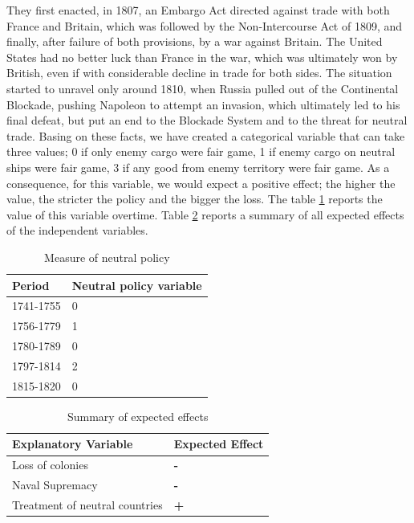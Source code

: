 \documentclass[12pt,a4paper,notitlepage,english]{article}
\begin{document}
They first enacted, in 1807, an Embargo Act directed against trade with both France and Britain, which was followed by the Non-Intercourse Act of 1809, and finally, after failure of both provisions, by a war against Britain.
The United States had no better luck than France in the war, which was ultimately won by British, even if with considerable decline in trade for both sides.
The situation started to unravel only around 1810, when Russia pulled out of the Continental Blockade, pushing Napoleon to attempt an invasion, which ultimately led to his final defeat, but put an end to the Blockade System and to the threat for neutral trade.
Basing on these facts, we have created a categorical variable that can take three values; 0 if only enemy cargo were fair game, 1 if enemy cargo on neutral ships were fair game, 3 if any good from enemy territory  were fair game.
As a consequence, for this variable, we would expect a positive effect; the higher the value, the stricter the policy and the bigger the loss.
The table \ref{neutral_policy} reports the value of this variable overtime.
Table \ref{summary} reports a summary of all expected effects of the independent variables.
\begin{table}[H]
\centering
\caption{Measure of neutral policy}
\label{neutral_policy}
\begin{tabular}{ll}
\hline \hline
Period & Neutral policy variable  \\ \hline
1741-1755 & 0                  \\
1756-1779 & 1       \\
1780-1789 & 0                 \\
1797-1814 & 2                 \\
1815-1820 & 0                 \\
\hline 
\end{tabular}
\end{table}

\begin{table}[H]
\centering
\caption{Summary of expected effects}
\label{summary}
\begin{tabular}{ll}
\hline \hline
Explanatory Variable & Expected Effect  \\ \hline
Loss of colonies & \textbf{-}                  \\
Naval Supremacy & \textbf{-}                 \\
Treatment of neutral countries &       \textbf{+}      \\ \hline 
\end{tabular}
\end{table}
\end{document}
